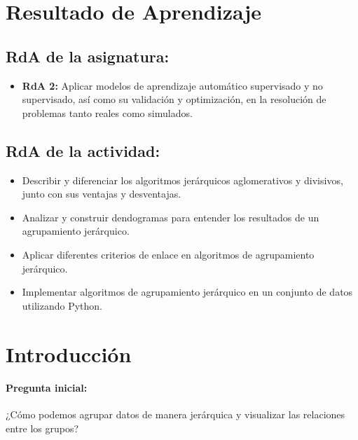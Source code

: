 \documentclass[a4,11pt]{aleph-notas}
\begin{document}
\encabezado

\section*{Resultado de Aprendizaje}

\subsection*{RdA de la asignatura:}
\begin{itemize}[leftmargin=*]
    \item \textbf{RdA 2:} Aplicar modelos de aprendizaje automático supervisado y no supervisado, así como su validación y optimización, en la resolución de problemas tanto reales como simulados.
\end{itemize}

\subsection*{RdA de la actividad:}

\begin{itemize}[leftmargin=*]
    \item Describir y diferenciar los algoritmos jerárquicos aglomerativos y divisivos, junto con sus ventajas y desventajas.
    \item Analizar y construir dendogramas para entender los resultados de un agrupamiento jerárquico.
    \item Aplicar diferentes criterios de enlace en algoritmos de agrupamiento jerárquico.
    \item Implementar algoritmos de agrupamiento jerárquico en un conjunto de datos utilizando Python.

\end{itemize}


\section*{Introducción}

\paragraph{Pregunta inicial:} 
 ¿Cómo podemos agrupar datos de manera jerárquica y visualizar las relaciones entre los grupos? 
\end{document}
